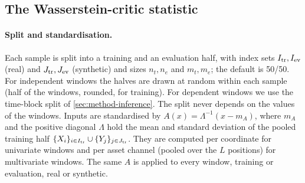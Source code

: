 \subsection{The Wasserstein-critic statistic}\label{sec:method-critic}

\paragraph{Split and standardisation.}
Each sample is split into a training and an evaluation half, with index sets $I_{\mathrm{tr}},I_{\mathrm{ev}}$
(real) and $J_{\mathrm{tr}},J_{\mathrm{ev}}$ (synthetic) and sizes $n_t,n_e$ and $m_t,m_e$; the default is 50/50.
For independent windows the halves are drawn at random within each sample (half of the windows,
rounded, for training). For dependent windows we use the time-block split of
\cref{sec:method-inference}. The split never depends on the values of the windows. Inputs are
standardised by $A(x)=\Lambda^{-1}(x-m_A)$, where $m_A$ and the positive diagonal $\Lambda$ hold
the mean and standard deviation of the pooled training half $\{X_i\}_{i\in I_{\mathrm{tr}}}\cup\{Y_j\}_{j\in J_{\mathrm{tr}}}$.
They are computed per coordinate for univariate windows and per asset channel (pooled over the
$L$ positions) for multivariate windows. The same $A$ is applied to every window, training or
evaluation, real or synthetic.


